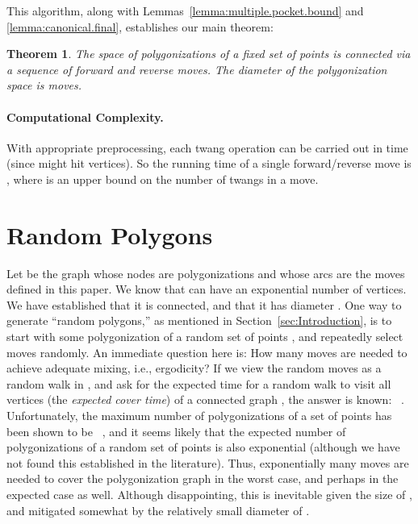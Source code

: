 \pdfoutput=1  \documentclass{article}
\newtheorem{theorem}{{\bf Theorem}}
\newcommand{\seclab}[1]{\label{sec:#1}}
\newcommand{\lemref}[1]{\ref{lemma:#1}}
\newcommand{\secref}[1]{\ref{sec:#1}}
\begin{document}
\vspace{-0.2em} \noindent This algorithm, along with
Lemmas~\lemref{multiple.pocket.bound} and \lemref{canonical.final},
establishes our main theorem:

\vspace{-0.2em}
\begin{theorem}
The space of polygonizations of a fixed set of  points is connected via a
sequence of forward and reverse moves.
The diameter of the polygonization space is  moves.
\end{theorem}


\vspace{-1.2em}
\paragraph{Computational Complexity.} With appropriate preprocessing, each twang
operation can be carried out in  time (since  might hit  vertices).
So the running time of a single forward/reverse move is , where  is an
upper bound on the number of twangs in a move. 


\section{Random Polygons}
\seclab{Random.Polygons}
Let  be the graph whose nodes are polygonizations and whose
arcs are the moves defined in this paper.
We know that  can have an exponential number  of vertices.
We have established that it is connected,
and that it has diameter .
One way to generate ``random polygons,'' as mentioned in
Section~\secref{Introduction}, is to start with some polygonization
 of a random set of  points ,
and repeatedly select moves randomly.
An immediate question here is: How
many moves are needed to achieve adequate mixing, i.e.,
ergodicity? If we view the random moves as a random walk in ,
and ask for the 
expected time for a random walk to visit all 
vertices (the \emph{expected cover time})
of a connected graph ,
the answer is known: ~\cite{f-tupct-95}.
Unfortunately, 
the maximum number of polygonizations of a set of  points
has been shown to be ~\cite{gnt-lbncf-00},
and it seems likely that the expected number of polygonizations of a
random set of points is also exponential
(although
we have not found this established in the literature).
Thus, exponentially many moves
are needed to cover the polygonization graph in the worst case, and perhaps
in the expected case as well.
Although disappointing, this is inevitable given the size of ,
and mitigated somewhat by the relatively small diameter of .
\end{document}
